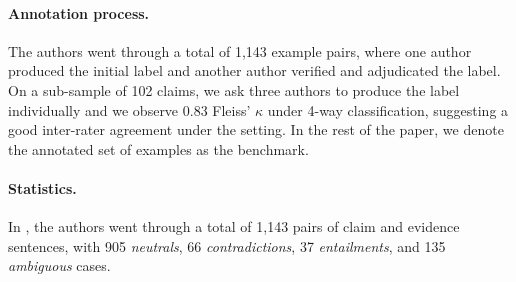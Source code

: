 

\paragraph{Annotation process.}
The authors went through a total of 1,143 example pairs, where one author produced the initial label and another author verified and adjudicated the label.  
On a sub-sample of 102 claims, we ask three authors to produce the label individually and we observe 0.83 Fleiss' $\kappa$ under 4-way classification, suggesting a good inter-rater agreement under the setting. In the rest of the paper, we denote the annotated set of examples as the \datasetname benchmark. 

\paragraph{Statistics.}
In \datasetname, the authors went through a total of 1,143 pairs of claim and evidence sentences, with 905 \emph{neutrals}, 66 \emph{contradictions}, 37 \emph{entailments}, and 135 \emph{ambiguous} cases.

